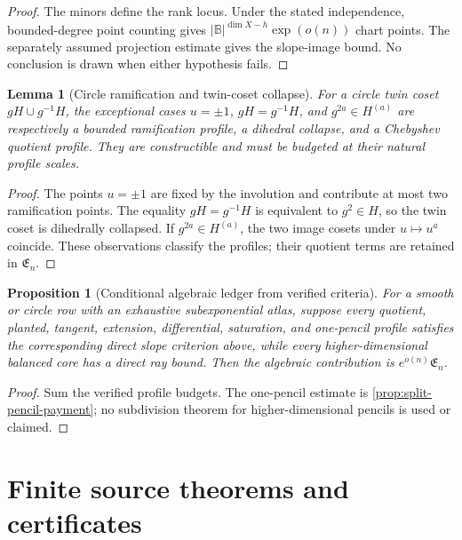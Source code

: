 \documentclass[12pt,a4paper]{amsart}
\numberwithin{equation}{section}
\newtheorem{proposition}[proposition]{Proposition}
\newtheorem{lemma}[lemma]{Lemma}
\theoremstyle{remark}
\newcommand{\B}{\mathbb B}
\newcommand{\abs}[1]{\lvert #1\rvert}
\begin{document}
\begin{proof}
The minors define the rank locus.  Under the stated independence,
bounded-degree point counting gives
\(\abs\B^{\dim X-h}\exp(o(n))\) chart points.  The separately assumed
projection estimate gives the slope-image bound.  No conclusion is drawn
when either hypothesis fails.
\end{proof}

\begin{lemma}[Circle ramification and twin-coset collapse]\label{lem:circle-edge-cases-repaired}
For a circle twin coset \(gH\cup g^{-1}H\), the exceptional cases
\(u=\pm1\), \(gH=g^{-1}H\), and \(g^{2a}\in H^{(a)}\) are respectively a
bounded ramification profile, a dihedral collapse, and a Chebyshev quotient
profile.  They are constructible and must be budgeted at their natural
profile scales.
\end{lemma}

\begin{proof}
The points \(u=\pm1\) are fixed by the involution and contribute at most
two ramification points.  The equality \(gH=g^{-1}H\) is equivalent to
\(g^2\in H\), so the twin coset is dihedrally collapsed.  If
\(g^{2a}\in H^{(a)}\), the two image cosets under \(u\mapsto u^a\)
coincide.  These observations classify the profiles; their quotient terms
are retained in \(\mathfrak E_n\).
\end{proof}

\begin{proposition}[Conditional algebraic ledger from verified criteria]\label{prop:closed-algebraic-ledger-repaired}
For a smooth or circle row with an exhaustive subexponential atlas, suppose
every quotient, planted, tangent, extension, differential, saturation, and
one-pencil profile satisfies the corresponding direct slope criterion
above, while every higher-dimensional balanced core has a direct ray bound.
Then the algebraic contribution is \(e^{o(n)}\mathfrak E_n\).
\end{proposition}

\begin{proof}
Sum the verified profile budgets.  The one-pencil estimate is
\cref{prop:split-pencil-payment}; no subdivision theorem for
higher-dimensional pencils is used or claimed.
\end{proof}

\section{Finite source theorems and certificates}\label{sec:source-integration}
\end{document}
